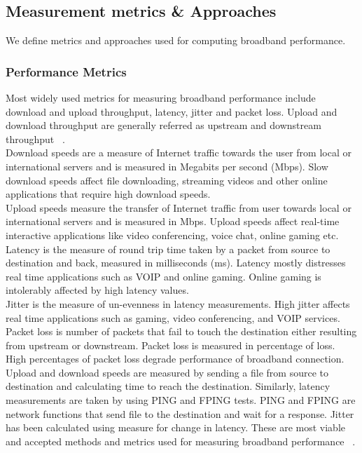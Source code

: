 \documentclass{sig-alternate-10pt}
\begin{document}
\begin{sloppypar}
\subsection {Measurement metrics \& Approaches}
We define metrics and approaches used for computing broadband performance.
\subsubsection {Performance Metrics}
Most widely used metrics for measuring broadband performance include download and upload throughput, latency, jitter and packet loss. Upload and download throughput are generally referred as upstream and downstream throughput ~\cite{08,12,16}.\\
\indent Download speeds are a measure of Internet traffic towards the user from local or international servers and is measured in Megabits per second (Mbps). Slow download speeds affect file downloading, streaming videos and other online applications that require high download speeds.\\
\indent Upload speeds measure the transfer of Internet traffic from user towards local or international servers and is measured in Mbps. Upload speeds affect real-time interactive applications like video conferencing, voice chat, online gaming etc.\\
\indent Latency is the measure of round trip time taken by a packet from source to destination and back, measured in milliseconds (ms). Latency mostly distresses real time applications such as VOIP and online gaming. Online gaming is intolerably affected by high latency values.\\
\indent Jitter is the measure of un-evenness in latency measurements. High jitter affects real time applications such as gaming, video conferencing, and VOIP services.\\
\indent Packet loss is number of packets that fail to touch the destination either resulting from upstream or downstream. Packet loss is measured in percentage of loss. High percentages of packet loss degrade performance of broadband connection.\\
\indent Upload and download speeds are measured by sending a file from source to destination and calculating time to reach the destination. Similarly, latency measurements are taken by using PING and FPING tests. PING and FPING are network functions that send file to the destination and wait for a response. Jitter has been calculated using measure for change in latency. These are most viable and accepted methods and metrics used for measuring broadband performance ~\cite{23}.

\end{sloppypar}
\end{document}
